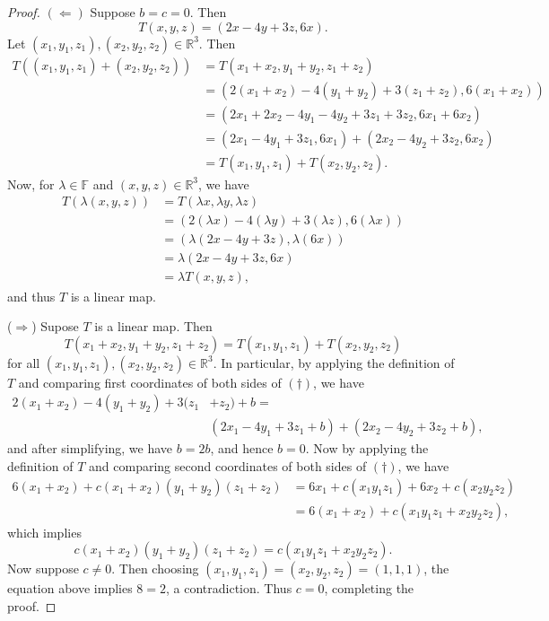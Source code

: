 \documentclass{extarticle}
\newcommand{\R}{\mathbb{R}}
\newcommand{\F}{\mathbb{F}}
\begin{document}
\begin{proof}
$(\Leftarrow)$ Suppose $b = c = 0$.  Then
\begin{equation*}
T(x,y,z) = (2x - 4y + 3z, 6x).
\end{equation*}
Let $(x_1,y_1,z_1), (x_2,y_2,z_2)\in\R^3$.  Then 
\begin{align*}
T((x_1,y_1,z_1) + (x_2,y_2,z_2)) &= T(x_1 + x_2, y_1 + y_2, z_1 + z_2)\\
&= (2(x_1 + x_2) - 4(y_1 + y_2) + 3(z_1 + z_2), 6(x_1 + x_2))\\
&= (2x_1 + 2x_2 - 4y_1 - 4y_2 + 3z_1 + 3z_2, 6x_1 + 6x_2)\\
&= (2x_1 - 4y_1 + 3z_1, 6x_1) + (2x_2 - 4y_2 + 3z_2, 6x_2)\\
&= T(x_1, y_1, z_1) + T(x_2, y_2,z_2).
\end{align*}
Now, for $\lambda\in\F$ and $(x,y,z)\in\R^3$, we have
\begin{align*}
T(\lambda(x,y,z)) &= T(\lambda x, \lambda y, \lambda z)\\
&= (2(\lambda x) - 4(\lambda y) + 3(\lambda z), 6(\lambda x))\\
&= (\lambda(2x - 4y + 3z), \lambda(6x))\\
&= \lambda(2x - 4y + 3z, 6x)\\
&= \lambda T(x, y, z),
\end{align*}
and thus $T$ is a linear map.
\par ($\Rightarrow$) Supose $T$ is a linear map.  Then
\begin{equation}\tag{$\dagger$}
T(x_1 + x_2,y_1 + y_2, z_1 + z_2) = T(x_1, y_1, z_1) + T(x_2, y_2, z_2)
\end{equation}
for all $(x_1,y_1,z_1),(x_2, y_2, z_2)\in\R^3$.  In particular, by applying the definition of $T$ and comparing first coordinates of both sides of $(\dagger)$, we have
\begin{align*}
2(x_1 + x_2) - 4(y_1+y_2) + 3(z_1&+ z_2) + b =\\ &(2x_1 - 4y_1 + 3z_1 + b) + (2x_2 - 4y_2 +3z_2 + b),
\end{align*}
and after simplifying, we have $b = 2b$, and hence $b= 0$.  Now by applying the definition of $T$ and comparing second coordinates of both sides of $(\dagger)$, we have
\begin{align*}
6(x_1 + x_2) + c(x_1+x_2)(y_1+y_2)(z_1+z_2) &= 6x_1 + c(x_1y_1z_1) + 6x_2 +  c(x_2y_2z_2)\\
&= 6(x_1 + x_2) + c(x_1y_1z_1 + x_2y_2z_2),
\end{align*}
which implies
\begin{equation*}
c(x_1+x_2)(y_1+y_2)(z_1+z_2)  = c(x_1y_1z_1 + x_2y_2z_2).
\end{equation*}
Now suppose $c\neq 0$.  Then choosing $(x_1,y_1,z_1) = (x_2,y_2,z_2) = (1,1,1)$, the equation above implies $8 = 2$, a contradiction.  Thus $c=0$, completing the proof.
\end{proof}
\end{document}
